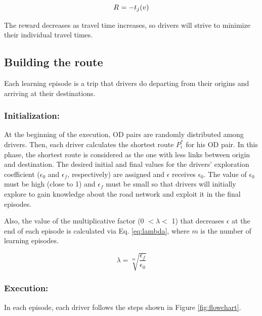 \documentclass{RITA}
\newcommand{\travTime}{\ensuremath{t_j}} 	%
\newcommand{\veh}{\ensuremath{v}}		%
\newcommand{\reward}[1][]{\ensuremath{R_#1}}	%
\begin{document}
\begin{equation}
\label{eq:reward}
\reward{} = - \travTime(\veh)
\end{equation}

The reward decreases as travel time increases, so drivers will strive to minimize their individual travel times.

\subsection{Building the route}

Each learning episode is a trip that drivers do departing from their origins and arriving at their destinations.

\subsubsection{Initialization:}
At the beginning of the execution, OD pairs are randomly distributed among drivers. Then, each driver calculates the shortest route $P_i^*$ for his OD pair. In this phase, the shortest route is considered as the one with less links between origin and destination. The desired initial and final values for the drivers' exploration coefficient ($\epsilon_0$ and $\epsilon_f$, respectively) are assigned and $\epsilon$ receives $\epsilon_0$. The value of $\epsilon_0$ must be high (close to 1) and $\epsilon_f$ must be small so that drivers will initially explore to gain knowledge about the road network and exploit it in the final episodes.

Also, the value of the multiplicative factor (0 $< \lambda <$ 1) that decreases $\epsilon$ at the end of each episode is calculated via Eq. \eqref{eq:lambda}, where $m$ is the number of learning episodes.

\begin{equation}
\label{eq:lambda}
\lambda = \sqrt[m]{\frac{\epsilon_f}{\epsilon_0}}
\end{equation}

\subsubsection{Execution:}

In each episode, each driver follows the steps shown in Figure \ref{fig:flowchart}.
\end{document}
